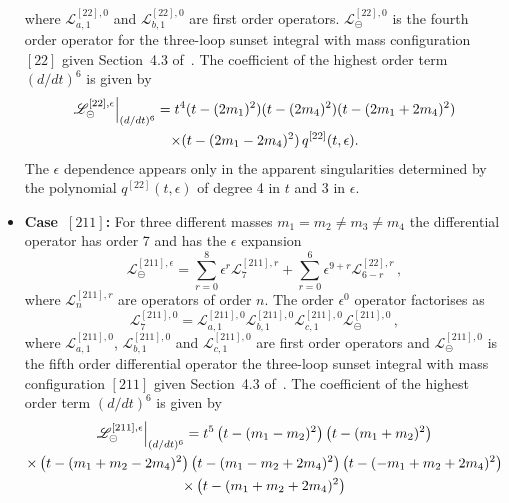 \documentclass[a4paper,12pt]{article}
\numberwithin{equation}{section}
\numberwithin{figure}{section}
\def\su{\circleddash}
\begin{document}
\begin{itemize}
       where  $ \mathscr{L}^{[22],0}_{a,1}$ and $
       \mathscr{L}^{[22],0}_{b,1}$ are first order operators. 
        $\mathscr{L}^{[22],0}_\su$ is the fourth order operator for the
       three-loop sunset integral with mass configuration $[22]$ given  Section~4.3 of~\cite{Lairez:2022zkj}.
    The coefficient of the highest order term $(d/dt)^6$    is given by
       \begin{multline}
                   \mathscr{L}^{[22],\epsilon}_\su\Big\vert_{(d/dt)^6}=
                   t^4(t-(2m_1)^2)(t-(2m_4)^2)(t-(2m_1+2m_4)^2)\cr\times(t-(2m_1-2m_4)^2)
                   \, q^{[22]}(t,\epsilon).
                 \end{multline}
                 The $\epsilon$ dependence appears only in the
                 apparent singularities determined by the polynomial
                 $q^{[22]}(t,\epsilon)$ of degree 4 in $t$ and $3$ in $\epsilon$.
     \item   {\bf Case~$[211]$:} For three different masses $m_1=m_2\neq m_3 \neq m_4$ the
  differential operator has order 7 and has the $\epsilon$ expansion
  \begin{equation}
    \mathscr{L}^{[211],\epsilon}_\su=       \sum_{r=0}^8 \epsilon^r
    \mathscr{L}^{[211],r}_{7}+  \sum_{r=0}^6 \epsilon^{9+r}   \mathscr{L}^{[22],r}_{6-r} \,,
  \end{equation}
   where  $ \mathscr{L}^{[211],r}_{n}$ 
  are operators of order $n$.
    The order $\epsilon^0$ operator factorises as
  \begin{equation}
         \mathscr{L}^{[211],0}_{7}=   \mathscr{L}^{[211],0}_{a,1}  \mathscr{L}^{[211],0}_{b,1} \mathscr{L}^{[211],0}_{c,1}\mathscr{L}^{[211],0}_\su \,,
       \end{equation}
        where  $ \mathscr{L}^{[211],0}_{a,1}$,  $
        \mathscr{L}^{[211],0}_{b,1}$ and  $ \mathscr{L}^{[211],0}_{c,1}$ are  first order operators
       and $\mathscr{L}^{[211],0}_\su$ is the fifth order differential operator the
       three-loop sunset integral with mass configuration $[211]$
       given Section~4.3 of~\cite{Lairez:2022zkj}.   The coefficient of the highest order term $(d/dt)^6$    is given by
       \begin{multline}
                   \mathscr{L}^{[211],\epsilon}_\su\Big\vert_{(d/dt)^6}=
                   t^5\left(t-(m_{1}-m_{2})^2\right) \left(t-(m_{1}+m_{2})^2\right)\cr\times
   \left(t-(m_{1}+m_{2}-2 m_{4})^2\right) \left(t-(m_{1}-m_{2}+2
   m_{4})^2\right) \left(t-(-m_{1}+m_{2}+2 m_{4})^2\right)\cr\times
   \left(t-(m_{1}+m_{2}+2 m_{4})^2\right)

\end{multline}
\end{itemize}
\end{document}
